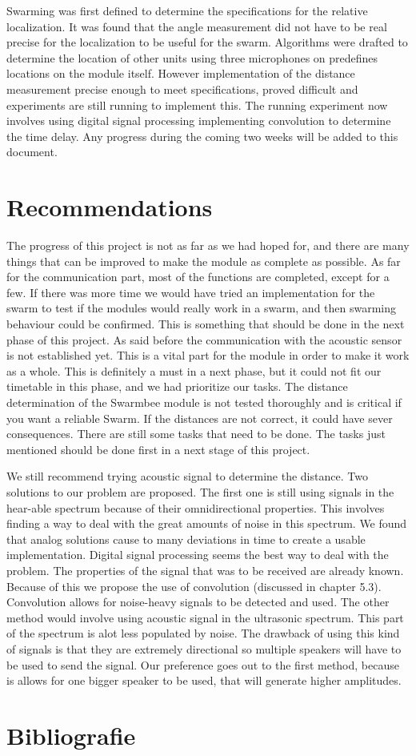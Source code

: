 \documentclass[10pt,a4paper]{article}
\begin{document}
Swarming was first defined to determine the specifications for the relative localization. It was found that the angle measurement did not have to be real precise for the localization to be useful for the swarm. Algorithms were drafted to determine the location of other units using three microphones on predefines locations on the module itself. However implementation of the distance measurement precise enough to meet specifications, proved difficult and experiments are still running to implement this. The running experiment now involves using digital signal processing implementing convolution to determine the time delay. Any progress during the coming two weeks will be added to this document. 

\section{Recommendations}
The progress of this project is not as far as we had hoped for, and there are many things that can be improved to make the module as complete as possible. As far for the communication part, most of the functions are completed, except for a few. If there was more time we would have tried an implementation for the swarm to test if the modules would really work in a swarm, and then swarming behaviour could be confirmed. This is something that should be done in the next phase of this project. As said before the communication with the acoustic sensor is not established yet. This is a vital part for the module in order to make it work as a whole. This is definitely a must in a next phase, but it could not fit our timetable in this phase, and we had prioritize our tasks. The distance determination of the Swarmbee module is not tested thoroughly and is critical if you want a reliable Swarm. If the distances are not correct, it could have sever consequences. There are still some tasks that need to be done. The tasks just mentioned should be done first in a next stage of this project.

We still recommend trying acoustic signal to determine the distance. Two solutions to our problem are proposed. The first one is still using signals in the hear-able spectrum because of their omnidirectional properties. This involves finding a way to deal with the great amounts of noise in this spectrum. We found that analog solutions cause to many deviations in time to create a usable implementation. Digital signal processing seems the best way to deal with the problem. The properties of the signal that was to be received are already known. Because of this we propose the use of convolution (discussed in chapter 5.3). Convolution allows for noise-heavy signals to be detected and used. 
The other method would involve using acoustic signal in the ultrasonic spectrum. This part of the spectrum is alot less populated by noise. The drawback of using this kind of signals is that they are extremely directional so multiple speakers will have to be used to send the signal. Our preference goes out to the first method, because is allows for one bigger speaker to be used, that will generate higher amplitudes.

\newpage






\section{Bibliografie}


\end{document}
